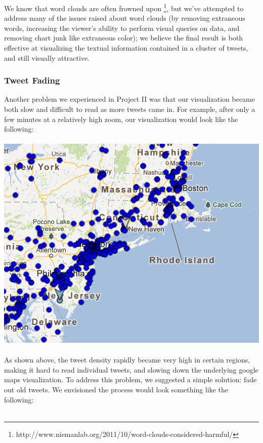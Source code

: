 \documentclass[pdftex,12pt,a4paper]{article}
\begin{document}
We know that word clouds are often frowned upon \footnote{http://www.niemanlab.org/2011/10/word-clouds-considered-harmful/}, but we've attempted to address many of the issues raised about word clouds (by removing extraneous words, increasing the viewer's ability to perform visual queries on data, and removing chart junk like extraneous color); we believe the final result is both effective at visualizing the textual information contained in a cluster of tweets, and still visually attractive. 

\subsubsection{Tweet Fading}
Another problem we experienced in Project II was that our visualization became both slow and difficult to read as more tweets came in. For example, after only a few minutes at a relatively high zoom, our visualization would look like the following: \\ \\
\includegraphics[width=5.5in]{toomuch.png} \\ \\
As shown above, the tweet density rapidly became very high in certain regions, making it hard to read individual tweets, and slowing down the underlying google maps visualization. To address this problem, we suggested a simple solution: fade out old tweets. We envisioned the process would look something like the following: \\ \\
\end{document}
